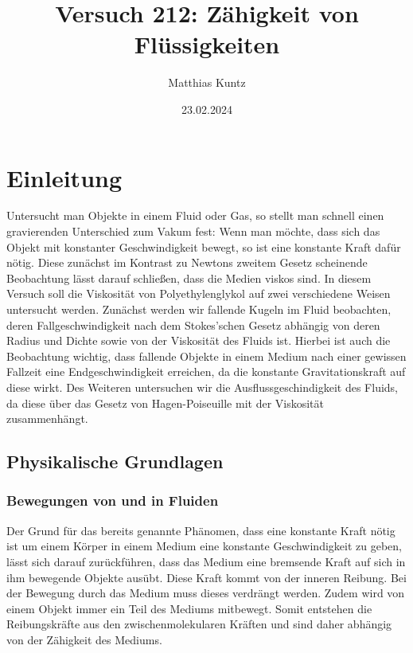 \documentclass{article}
\title{Versuch 212: Zähigkeit von Flüssigkeiten}
\author{Matthias Kuntz}
\date{23.02.2024}
\begin{document}
\maketitle

\tableofcontents

\newpage

\section{Einleitung}

Untersucht man Objekte in einem Fluid oder Gas, so stellt man schnell einen gravierenden Unterschied zum Vakum fest: Wenn man möchte, dass sich das Objekt mit konstanter Geschwindigkeit bewegt, so ist eine konstante Kraft dafür nötig. Diese zunächst im Kontrast zu Newtons zweitem Gesetz scheinende Beobachtung lässt darauf schließen, dass die Medien viskos sind. In diesem Versuch soll die Viskosität von Polyethylenglykol auf zwei verschiedene Weisen untersucht werden. Zunächst werden wir fallende Kugeln im Fluid beobachten, deren Fallgeschwindigkeit nach dem Stokes'schen Gesetz abhängig von deren Radius und Dichte sowie von der Viskosität des Fluids ist. Hierbei ist auch die Beobachtung wichtig, dass fallende Objekte in einem Medium nach einer gewissen Fallzeit eine Endgeschwindigkeit erreichen, da die konstante Gravitationskraft auf diese wirkt. Des Weiteren untersuchen wir die Ausflussgeschindigkeit des Fluids, da diese über das Gesetz von Hagen-Poiseuille mit der Viskosität zusammenhängt.

\subsection{Physikalische Grundlagen}

\subsubsection{Bewegungen von und in Fluiden}

Der Grund für das bereits genannte Phänomen, dass eine konstante Kraft nötig ist um einem Körper in einem Medium eine konstante Geschwindigkeit zu geben, lässt sich darauf zurückführen, dass das Medium eine bremsende Kraft auf sich in ihm bewegende Objekte ausübt. Diese Kraft kommt von der inneren Reibung. Bei der Bewegung durch das Medium muss dieses verdrängt werden. Zudem wird von einem Objekt immer ein Teil des Mediums mitbewegt. Somit entstehen die Reibungskräfte aus den zwischenmolekularen Kräften und sind daher abhängig von der Zähigkeit des Mediums. 
\end{document}
